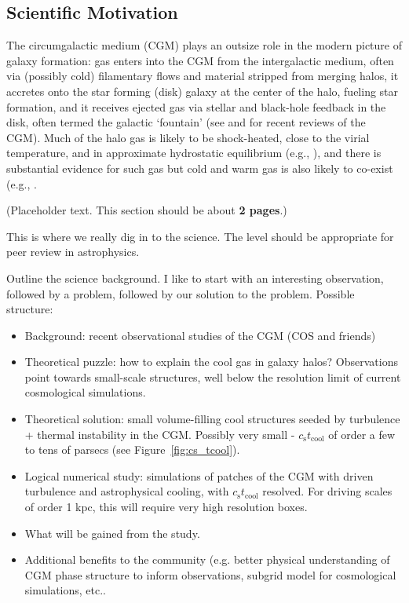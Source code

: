 \documentclass[11pt,letterpaper,english]{article}
\begin{document}
\vspace{-.25in}
\subsection{Scientific Motivation}
\vspace{-.2in}

The circumgalactic medium (CGM) plays an outsize role in the modern picture of galaxy formation: gas enters into the CGM from the intergalactic medium, often via (possibly cold) filamentary flows and material stripped from merging halos, it accretes onto the star forming (disk) galaxy at the center of the halo, fueling star formation, and it receives ejected gas via stellar and black-hole feedback in the disk, often termed the galactic `fountain' (see \cite{Tumlinson17} and \cite{Putman12} for recent reviews of the CGM).  Much of the halo gas is likely to be shock-heated, close to the virial temperature, and in approximate hydrostatic equilibrium (e.g., \cite{White78, Fielding17}), and there is substantial evidence for such gas \cite{Bregman07} but cold and warm gas is also likely to co-exist (e.g., \cite{Wakker2009, Rigby02}.

(Placeholder text. This section should be about {\bf 2 pages}.)

This is where we really dig in to the science. The level should be appropriate for peer review in astrophysics.

Outline the science background. I like to start with an interesting observation, followed by a problem, followed by our solution to the problem. Possible structure:
\begin{itemize}
\item{Background: recent observational studies of the CGM (COS and friends)}
\item{Theoretical puzzle: how to explain the cool gas in galaxy halos? Observations point towards small-scale structures, well below the resolution limit of current cosmological simulations.}
\item{Theoretical solution: small volume-filling cool structures seeded by turbulence + thermal instability in the CGM. Possibly very small - $c_\mathrm{s} t_\mathrm{cool}$ of order a few to tens of parsecs (see Figure~\ref{fig:cs_tcool}).}
\item{Logical numerical study: simulations of patches of the CGM with driven turbulence and astrophysical cooling, with $c_\mathrm{s} t_\mathrm{cool}$ resolved. For driving scales of order 1 kpc, this will require very high resolution boxes.}
\item{What will be gained from the study.}
\item{Additional benefits to the community (e.g. better physical understanding of CGM phase structure to inform observations, subgrid model for cosmological simulations, etc..}
\end{itemize}
\end{document}

